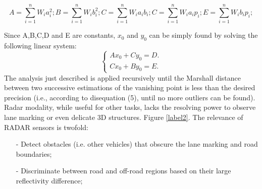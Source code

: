 \documentclass[12pt]{article}
\begin{document}
\begin{equation}\label{sum1}
A= \sum^n_{i=1} W_i a_i^2; B=\sum^n_{i=1} W_i b_i^2;C=\sum^n_{i=1} W_i a_i b_i ;C=\sum^n_{i=1} W_i a_i p_i ;E=\sum^n_{i=1} W_i b_ip_i;
\end{equation}
\raggedright Since A,B,C,D and E are constants, $x_0$ and $y_0$ can be simply found by solving the following linear system:
$$\begin{cases}
Ax_0+Cy_0=D.\\
Cx_0+By_0=E.
\end{cases}$$
The analysis just described is applied recursively until the Marshall distance between two successive estimations of the vanishing point is less than the desired precision (i.e., according to disequation (5\label{sum1}), until no more outliers can be found). Radar modality, while useful for other tasks, lacks the resolving power to observe lane marking or even delicate 3D structures. Figure \ref{label2}. The relevance of RADAR sensors is twofold:
\begin{itemize}
    \item[-] Detect obstacles (i.e. other vehicles) that obscure the lane marking and road boundaries;
    \item[-] Discriminate between road and off-road regions based on their large reflectivity difference;
\end{itemize}
\end{document}
